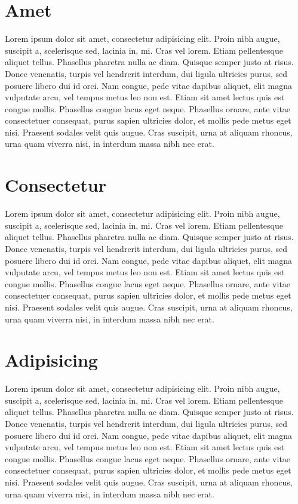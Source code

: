 \documentclass{mini}
\begin{document}
\section{Amet}

Lorem ipsum dolor sit amet, consectetur adipisicing elit. Proin nibh augue, suscipit a, scelerisque sed, lacinia in, mi. Cras vel lorem. Etiam pellentesque aliquet tellus. Phasellus pharetra nulla ac diam. Quisque semper justo at risus. Donec venenatis, turpis vel hendrerit interdum, dui ligula ultricies purus, sed posuere libero dui id orci. Nam congue, pede vitae dapibus aliquet, elit magna vulputate arcu, vel tempus metus leo non est. Etiam sit amet lectus quis est congue mollis. Phasellus congue lacus eget neque. Phasellus ornare, ante vitae consectetuer consequat, purus sapien ultricies dolor, et mollis pede metus eget nisi. Praesent sodales velit quis augue. Cras suscipit, urna at aliquam rhoncus, urna quam viverra nisi, in interdum massa nibh nec erat.

\section{Consectetur}

Lorem ipsum dolor sit amet, consectetur adipisicing elit. Proin nibh augue, suscipit a, scelerisque sed, lacinia in, mi. Cras vel lorem. Etiam pellentesque aliquet tellus. Phasellus pharetra nulla ac diam. Quisque semper justo at risus. Donec venenatis, turpis vel hendrerit interdum, dui ligula ultricies purus, sed posuere libero dui id orci. Nam congue, pede vitae dapibus aliquet, elit magna vulputate arcu, vel tempus metus leo non est. Etiam sit amet lectus quis est congue mollis. Phasellus congue lacus eget neque. Phasellus ornare, ante vitae consectetuer consequat, purus sapien ultricies dolor, et mollis pede metus eget nisi. Praesent sodales velit quis augue. Cras suscipit, urna at aliquam rhoncus, urna quam viverra nisi, in interdum massa nibh nec erat.

\section{Adipisicing}

Lorem ipsum dolor sit amet, consectetur adipisicing elit. Proin nibh augue, suscipit a, scelerisque sed, lacinia in, mi. Cras vel lorem. Etiam pellentesque aliquet tellus. Phasellus pharetra nulla ac diam. Quisque semper justo at risus. Donec venenatis, turpis vel hendrerit interdum, dui ligula ultricies purus, sed posuere libero dui id orci. Nam congue, pede vitae dapibus aliquet, elit magna vulputate arcu, vel tempus metus leo non est. Etiam sit amet lectus quis est congue mollis. Phasellus congue lacus eget neque. Phasellus ornare, ante vitae consectetuer consequat, purus sapien ultricies dolor, et mollis pede metus eget nisi. Praesent sodales velit quis augue. Cras suscipit, urna at aliquam rhoncus, urna quam viverra nisi, in interdum massa nibh nec erat.
\end{document}
